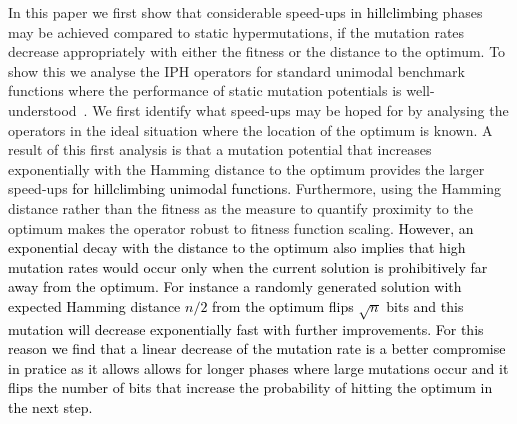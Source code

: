 \documentclass[lettersize,journal]{IEEEtran}
\newcommand{\new}[1]{\textcolor{black}{#1}}
\begin{document}
In this paper we first show that considerable speed-ups in \new{hillclimbing} phases may be achieved compared to static hypermutations, 
if the mutation rates decrease appropriately with either the fitness or the distance to the optimum. 
To show this we analyse the IPH operators for standard unimodal benchmark functions where the performance of static mutation potentials is well-understood~\cite{CorusOlivetoYazdaniGECCO2017}.
We first identify what speed-ups may be hoped for by analysing the operators in the ideal situation where the location of the optimum is known.
A result of this first analysis is that a mutation potential that increases exponentially with the Hamming distance to the optimum %
provides the larger speed-ups \new{for hillclimbing unimodal functions}. Furthermore, using the Hamming distance rather than the fitness as the measure to quantify proximity to the optimum
makes the operator robust to fitness function scaling.
\new{However, an exponential decay with the distance to the optimum also implies that high mutation rates would occur only when the current solution is prohibitively far away from the optimum. For instance a randomly generated solution with expected Hamming distance $n/2$ from the optimum flips $\sqrt{n}$ bits and this mutation will decrease exponentially fast with further improvements. For this reason we find that a linear decrease of the mutation rate is a better compromise in pratice as it allows allows for longer phases where large mutations occur} \textcolor{black}{ and it flips the number of bits that increase the probability of hitting the optimum in the next step.}
\end{document}
